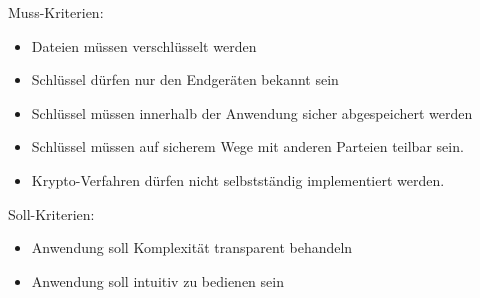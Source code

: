 \documentclass[10pt, a4paper,headsepline]{scrreprt}
\begin{document}
Muss-Kriterien:
\begin{itemize}
\item Dateien müssen verschlüsselt werden
\item Schlüssel dürfen nur den Endgeräten bekannt sein
\item Schlüssel müssen innerhalb der Anwendung sicher abgespeichert werden
\item Schlüssel müssen auf sicherem Wege mit anderen Parteien teilbar sein.
\item Krypto-Verfahren dürfen nicht selbstständig implementiert werden.
\end{itemize}
Soll-Kriterien:
\begin{itemize}
\item Anwendung soll Komplexität transparent behandeln
\item Anwendung soll intuitiv zu bedienen sein
\end{itemize}
\end{document}
